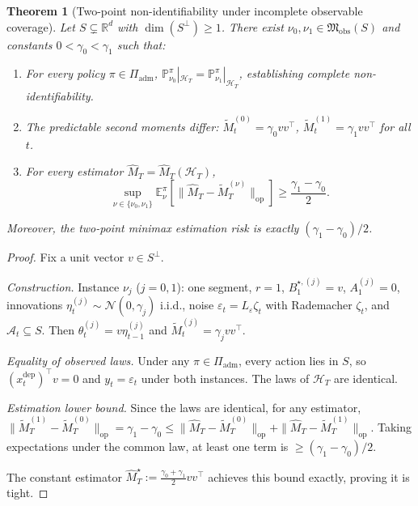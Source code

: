 \documentclass[12pt]{article}
\newcommand{\R}{\mathbb{R}}
\newcommand{\E}{\mathbb{E}}
\newcommand{\Prob}{\mathbb{P}}
\newcommand{\op}{\mathrm{op}}
\newcommand{\cA}{\mathcal{A}}
\newcommand{\cH}{\mathcal{H}}
\newtheorem{theorem}{Theorem}
\theoremstyle{plain}
\theoremstyle{definition}
\begin{document}
\begin{theorem}[Two-point non-identifiability under incomplete observable coverage]
\label{thm:two_point_nonid}
Let $S \subsetneq \R^d$ with $\dim(S^\perp) \ge 1$. There exist $\nu_0, \nu_1 \in \mathfrak{M}_{\mathrm{obs}}(S)$ and constants $0 < \gamma_0 < \gamma_1$ such that:
\begin{enumerate}[label=(\roman*)]
\item For every policy $\pi \in \Pi_{\mathrm{adm}}$, $\Prob_{\nu_0}^\pi|_{\cH_T} = \Prob_{\nu_1}^\pi|_{\cH_T}$, establishing complete non-identifiability.
\item The predictable second moments differ: $\widetilde{M}_t^{(0)} = \gamma_0 vv^\top$, $\widetilde{M}_t^{(1)} = \gamma_1 vv^\top$ for all $t$.
\item For every estimator $\widehat{M}_T = \widehat{M}_T(\cH_T)$,
\[
\sup_{\nu \in \{\nu_0, \nu_1\}} \E_\nu^\pi[\|\widehat{M}_T - \widetilde{M}_T^{(\nu)}\|_{\op}] \ge \frac{\gamma_1 - \gamma_0}{2}.
\]
\end{enumerate}
Moreover, the two-point minimax estimation risk is exactly $(\gamma_1 - \gamma_0)/2$.
\end{theorem}

\begin{proof}
Fix a unit vector $v \in S^\perp$.

\emph{Construction.} Instance $\nu_j$ ($j = 0, 1$): one segment, $r = 1$, $B_1^{\star,(j)} = v$, $A_1^{(j)} = 0$, innovations $\eta_t^{(j)} \sim \mathcal{N}(0, \gamma_j)$ i.i.d., noise $\varepsilon_t = L_\varepsilon \zeta_t$ with Rademacher $\zeta_t$, and $\cA_t \subseteq S$. Then $\theta_t^{(j)} = v\eta_{t-1}^{(j)}$ and $\widetilde{M}_t^{(j)} = \gamma_j vv^\top$.

\emph{Equality of observed laws.} Under any $\pi \in \Pi_{\mathrm{adm}}$, every action lies in $S$, so $(x_t^{\mathrm{dep}})^\top v = 0$ and $y_t = \varepsilon_t$ under both instances. The laws of $\cH_T$ are identical.

\emph{Estimation lower bound.} Since the laws are identical, for any estimator, $\|\widetilde{M}_T^{(1)} - \widetilde{M}_T^{(0)}\|_{\op} = \gamma_1 - \gamma_0 \le \|\widehat{M}_T - \widetilde{M}_T^{(0)}\|_{\op} + \|\widehat{M}_T - \widetilde{M}_T^{(1)}\|_{\op}$. Taking expectations under the common law, at least one term is $\ge (\gamma_1 - \gamma_0)/2$.

The constant estimator $\widehat{M}_T^\star := \frac{\gamma_0 + \gamma_1}{2} vv^\top$ achieves this bound exactly, proving it is tight.
\end{proof}
\end{document}
